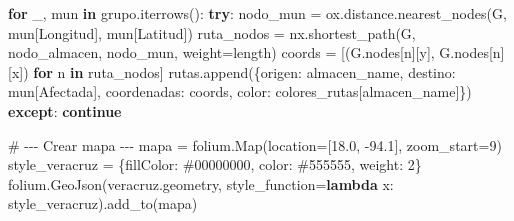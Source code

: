 \documentclass[
  spanish,
  us-letterpaper,
]{scrreprt}
\newenvironment{Shaded}{\begin{snugshade}}{\end{snugshade}}
\newcommand{\CommentTok}[1]{\textcolor[rgb]{0.37,0.37,0.37}{#1}}
\newcommand{\ControlFlowTok}[1]{\textcolor[rgb]{0.00,0.23,0.31}{\textbf{#1}}}
\newcommand{\DecValTok}[1]{\textcolor[rgb]{0.68,0.00,0.00}{#1}}
\newcommand{\FloatTok}[1]{\textcolor[rgb]{0.68,0.00,0.00}{#1}}
\newcommand{\KeywordTok}[1]{\textcolor[rgb]{0.00,0.23,0.31}{\textbf{#1}}}
\newcommand{\NormalTok}[1]{\textcolor[rgb]{0.00,0.23,0.31}{#1}}
\newcommand{\OperatorTok}[1]{\textcolor[rgb]{0.37,0.37,0.37}{#1}}
\newcommand{\StringTok}[1]{\textcolor[rgb]{0.13,0.47,0.30}{#1}}
\numberwithin{equation}{section}
\begin{document}
\begin{Shaded}
\begin{Highlighting}[]
    \ControlFlowTok{for}\NormalTok{ \_, mun }\KeywordTok{in}\NormalTok{ grupo.iterrows():}
        \ControlFlowTok{try}\NormalTok{:}
\NormalTok{            nodo\_mun }\OperatorTok{=}\NormalTok{ ox.distance.nearest\_nodes(G,}
\NormalTok{             mun[}\StringTok{\textquotesingle{}Longitud\textquotesingle{}}\NormalTok{], mun[}\StringTok{\textquotesingle{}Latitud\textquotesingle{}}\NormalTok{])}
\NormalTok{            ruta\_nodos }\OperatorTok{=}\NormalTok{ nx.shortest\_path(G,}
\NormalTok{             nodo\_almacen, nodo\_mun, weight}\OperatorTok{=}\StringTok{\textquotesingle{}length\textquotesingle{}}\NormalTok{)}
\NormalTok{            coords }\OperatorTok{=}\NormalTok{ [(G.nodes[n][}\StringTok{\textquotesingle{}y\textquotesingle{}}\NormalTok{],}
\NormalTok{             G.nodes[n][}\StringTok{\textquotesingle{}x\textquotesingle{}}\NormalTok{]) }\ControlFlowTok{for}\NormalTok{ n }\KeywordTok{in}\NormalTok{ ruta\_nodos]}
\NormalTok{            rutas.append(\{}\StringTok{\textquotesingle{}origen\textquotesingle{}}\NormalTok{: almacen\_name,}
             \StringTok{\textquotesingle{}destino\textquotesingle{}}\NormalTok{: mun[}\StringTok{\textquotesingle{}Afectada\textquotesingle{}}\NormalTok{],}
             \StringTok{\textquotesingle{}coordenadas\textquotesingle{}}\NormalTok{: coords, }
             \StringTok{\textquotesingle{}color\textquotesingle{}}\NormalTok{: colores\_rutas[almacen\_name]\})}
        \ControlFlowTok{except}\NormalTok{:}
            \ControlFlowTok{continue}

\CommentTok{\# {-}{-}{-} Crear mapa {-}{-}{-}}
\NormalTok{mapa }\OperatorTok{=}\NormalTok{ folium.Map(location}\OperatorTok{=}\NormalTok{[}\FloatTok{18.0}\NormalTok{, }\OperatorTok{{-}}\FloatTok{94.1}\NormalTok{], zoom\_start}\OperatorTok{=}\DecValTok{9}\NormalTok{)}
\NormalTok{style\_veracruz }\OperatorTok{=}\NormalTok{ \{}\StringTok{\textquotesingle{}fillColor\textquotesingle{}}\NormalTok{: }\StringTok{\textquotesingle{}\#00000000\textquotesingle{}}\NormalTok{,}
 \StringTok{\textquotesingle{}color\textquotesingle{}}\NormalTok{: }\StringTok{\textquotesingle{}\#555555\textquotesingle{}}\NormalTok{, }\StringTok{\textquotesingle{}weight\textquotesingle{}}\NormalTok{: }\DecValTok{2}\NormalTok{\}}
\NormalTok{folium.GeoJson(veracruz.geometry,}
\NormalTok{ style\_function}\OperatorTok{=}\KeywordTok{lambda}\NormalTok{ x: style\_veracruz).add\_to(mapa)}


\end{Highlighting}
\end{Shaded}
\end{document}
